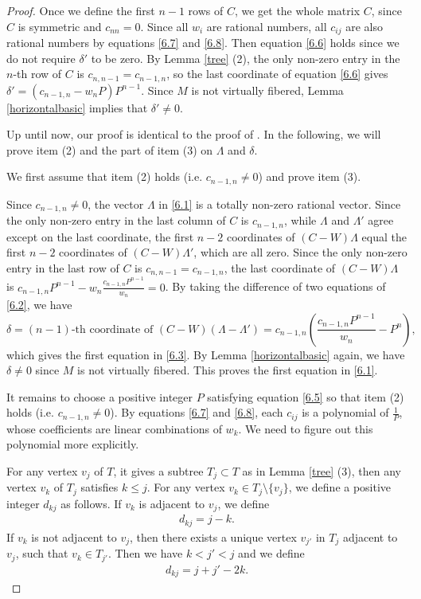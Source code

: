 \documentclass{amsart}
\numberwithin{equation}{section}
\theoremstyle{definition}
\begin{document}
\begin{proof}
Once we define the first $n-1$ rows of $C$, we get the whole matrix $C$, since $C$ is symmetric and $c_{nn}=0$. Since all $w_i$ are rational numbers, all $c_{ij}$ are also rational numbers by equations \eqref{6.7} and \eqref{6.8}.  Then equation \eqref{6.6} holds since we do not require $\delta'$ to be zero. By Lemma \ref{tree} (2), the only non-zero entry in the $n$-th row of $C$ is $c_{n,n-1}=c_{n-1,n}$, so the last coordinate of equation  \eqref{6.6} gives $\delta'=(c_{n-1,n}-w_nP)P^{n-1}$. Since $M$ is not virtually fibered, Lemma \ref{horizontalbasic} implies that $\delta'\ne 0$.

Up until now, our proof is identical to the proof of \cite[Lemma 3.2]{WY}. In the following, we will prove item (2) and the part of item (3) on $\Lambda$ and $\delta$. 

We first assume that item (2) holds (i.e. $c_{n-1,n}\ne 0$) and prove item (3). 

Since $c_{n-1,n}\ne 0$, the vector $\Lambda$ in \eqref{6.1} is a totally non-zero rational vector. 
Since the only non-zero entry in the last column of $C$ is $c_{n-1,n}$, while $\Lambda$ and $\Lambda'$ agree except on the last coordinate, the first $n-2$ coordinates of $(C-W)\Lambda$ equal the first $n-2$ coordinates of $(C-W)\Lambda'$, which are all zero.
Since the only non-zero entry in the last row of $C$ is $c_{n,n-1}=c_{n-1,n}$, the last coordinate of $(C-W)\Lambda$ is $c_{n-1,n}P^{n-1}-w_n\frac{c_{n-1,n}P^{n-1}}{w_n}=0$. By taking the difference of two equations of \eqref{6.2}, we have
$$\delta=(n-1)\text{-th\ coordinate\ of\ }(C-W)(\Lambda-\Lambda')=c_{n-1,n}(\frac{c_{n-1,n}P^{n-1}}{w_n}-P^n),$$ 
which gives the first equation in \eqref{6.3}.
By Lemma \ref{horizontalbasic} again, we have $\delta\ne 0$ since $M$ is not virtually fibered. This proves the first equation in \eqref{6.1}.

It remains to choose a positive integer $P$ satisfying equation \eqref{6.5} so that item (2) holds (i.e. $c_{n-1,n}\ne 0$). By equations \eqref{6.7} and \eqref{6.8}, each $c_{ij}$ is a polynomial of $\frac{1}{P}$, whose coefficients are linear combinations of $w_k$. We need to figure out this polynomial more explicitly.

For any vertex $v_j$ of $T$, it gives a subtree $T_j\subset T$ as in Lemma \ref{tree} (3), then any vertex $v_k$ of $T_j$ satisfies $k\leq j$. For any vertex $v_k\in T_j\setminus \{v_j\}$, we define a positive integer $d_{kj}$ as follows. If $v_k$ is adjacent to $v_j$, we define 
\begin{align}\label{6.9}
d_{kj}=j-k.
\end{align}
If $v_k$ is not adjacent to $v_j$, then there exists a unique vertex $v_{j'}$ in $T_j$ adjacent to $v_j$, such that $v_k\in T_{j'}$. Then we have $k<j'<j$ and we define 
\begin{align}\label{6.10}
d_{kj}=j+j'-2k.
\end{align}


\end{proof}
\end{document}
